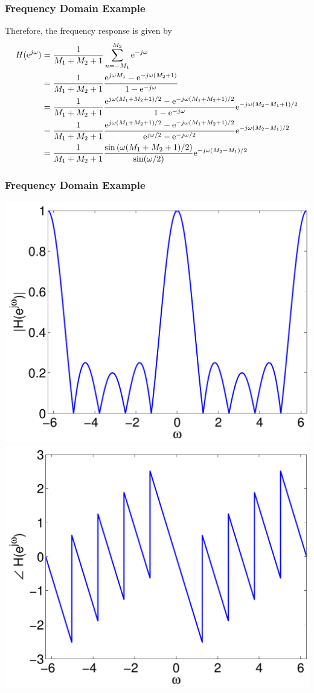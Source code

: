 \documentclass[mathserif,9pt,handout]{beamer}
\begin{document}
\begin{frame}\frametitle{Frequency Domain Example}\small

  Therefore, the frequency response is given by 
  \begin{align}
    H({\textrm{e}}^{j\omega}) &= \frac{1}{M_1+M_2+1} \sum_{n=-M_1}^{M_2} {\textrm{e}}^{-j\omega} \nonumber \\
    &=\frac{1}{M_1+M_2+1} \frac{{\textrm{e}}^{j\omega M_1} - {\textrm{e}}^{-j\omega (M_2 +1)}}{1 - {\textrm{e}}^{-j\omega}} \nonumber \\
    &=\frac{1}{M_1+M_2+1} \frac{{\textrm{e}}^{j\omega (M_1+M_2+1)/2} - {\textrm{e}}^{-j\omega (M_1+M_2+1)/2}}{1 - {\textrm{e}}^{-j\omega}} {\textrm{e}}^{-j\omega (M_2-M_1+1)/2}\nonumber \\
    &=\frac{1}{M_1+M_2+1} \frac{{\textrm{e}}^{j\omega (M_1+M_2+1)/2} - {\textrm{e}}^{-j\omega (M_1+M_2+1)/2}}{ {\textrm{e}}^{j\omega/2} -{\textrm{e}}^{-j\omega/2} } {\textrm{e}}^{-j\omega (M_2-M_1)/2}\nonumber \\
    &=\frac{1}{M_1+M_2+1} \frac{ \sin\left( \omega (M_1+M_2+1)/2 \right) }{ \sin(\omega/2) } {\textrm{e}}^{-j\omega (M_2-M_1)/2}\nonumber 
  \end{align}   
   
\end{frame}

\begin{frame}\frametitle{Frequency Domain Example}\small

  \begin{center}
     \includegraphics[width=.45\textwidth]{frmas_f.pdf}\hspace{1em}
     \includegraphics[width=.45\textwidth]{frmas_a.pdf}
  \end{center}
   
\end{frame}
\end{document}

